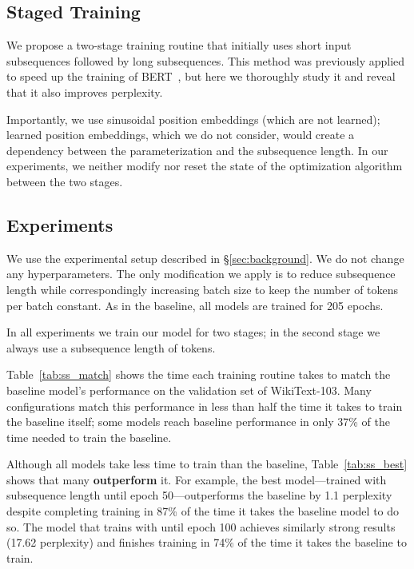 \documentclass[11pt,a4paper]{article}
\begin{document}
\subsection{Staged Training}

We propose a two-stage training routine that initially uses short input subsequences followed by long subsequences. This method was previously applied to speed up the training of BERT~\cite{bert}, but here we thoroughly study it and reveal that it also improves perplexity. 

Importantly, we use sinusoidal position embeddings (which are not learned); learned position embeddings, which we do not consider, would create a dependency between the parameterization and the subsequence length. In our experiments, we neither modify nor reset the state of the optimization algorithm between the two stages. 
\subsection{Experiments}
\label{sec:ss_results}



We use the experimental setup described in \S\ref{sec:background}. We do not change any hyperparameters. The only modification we apply is to reduce subsequence length while correspondingly increasing batch size to keep the number of tokens per batch constant. As in the baseline, all models are trained for 205 epochs. 

In all experiments we train our model for two stages; in the second stage we always use a subsequence length of  tokens. 






Table~\ref{tab:ss_match} shows the time each training routine takes to match the baseline model's performance on the validation set of WikiText-103. Many configurations match this performance in less than half the time it takes to train the baseline itself; some models reach baseline performance in only 37\% of the time needed to train the baseline. 







Although all models take less time to train than the baseline, Table~\ref{tab:ss_best} shows that many \textbf{outperform} it. For example, the best model---trained with subsequence length  until epoch 50---outperforms the baseline by 1.1 perplexity despite completing training in 87\% of the time it takes the baseline model to do so.  The model that trains with  until epoch 100 achieves similarly strong results (17.62 perplexity) and finishes training in 74\% of the time it takes the baseline to train. 
\end{document}
